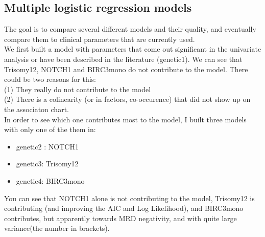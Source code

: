 \documentclass[a4paper,11pt]{article}
\begin{document}
\subsection{Multiple logistic regression models}

The goal is to compare several different models and their quality, and eventually compare them to clinical parameters that are currently used.\\
We first built a model with parameters that come out significant in the univariate analysis or have been described in the literature (genetic1). We can see that Trisomy12, NOTCH1 and BIRC3mono do not contribute to the model. There could be two reasons for this:\\
(1) They really do not contribute to the model\\
(2) There is a colinearity (or in factors, co-occurence) that did not show up on the associaton chart.\\

In order to see which one contributes most to the model, I built three models with only one of the them in:\\
\begin{itemize}
  \item genetic2 : NOTCH1
  \item genetic3: Trisomy12
  \item genetic4: BIRC3mono
\end{itemize}
You can see that NOTCH1 alone is not contributing to the model, Trisomy12 is contributing (and improving the AIC and Log Likelihood), and BIRC3mono contributes, but apparently towards MRD negativity, and with quite large variance(the number in brackets).
\end{document}
